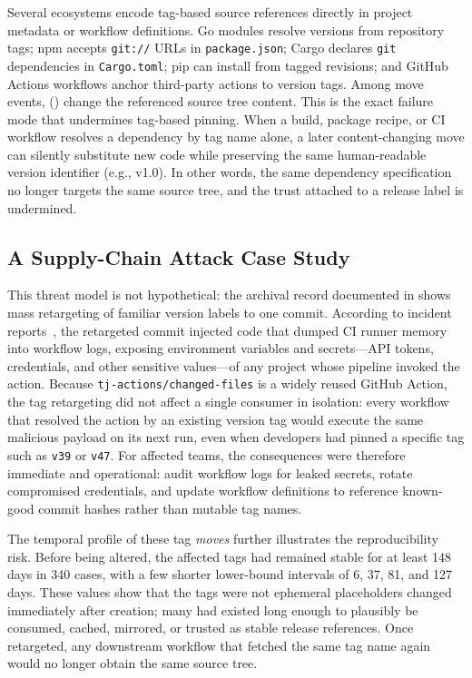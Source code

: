 Several ecosystems encode tag-based source references directly in project metadata or workflow definitions.
Go modules resolve versions from repository tags; npm accepts \texttt{git://} URLs in \texttt{package.json}; Cargo declares \texttt{git} dependencies in \texttt{Cargo.toml}; pip can install from tagged revisions; and GitHub Actions workflows anchor third-party actions to version tags.
Among \LegitMoves move events, \DirectoryDiff (\PercentMovesContentChange) change the referenced source tree content.
This is the exact failure mode that undermines tag-based pinning.
When a build, package recipe, or CI workflow resolves a dependency by tag name alone, a later content-changing move can silently substitute new code while preserving the same human-readable version identifier (e.g., v1.0).
In other words, the same dependency specification no longer targets the same source tree, and the trust attached to a release label is undermined.

\subsection{A Supply-Chain Attack Case Study}
\label{subsec:tags-attack-case}

This threat model is not hypothetical: the archival record documented in  shows mass retargeting of familiar version labels to one commit.
According to incident reports~\cite{paloalto_unit42_2025}, the retargeted commit injected code that dumped CI runner memory into workflow logs, exposing environment variables and secrets---API tokens, credentials, and other sensitive values---of any project whose pipeline invoked the action.
Because \texttt{\footnotesize{tj-actions/changed-files}} is a widely reused GitHub Action, the tag retargeting did not affect a single consumer in isolation: every workflow that resolved the action by an existing version tag would execute the same malicious payload on its next run, even when developers had pinned a specific tag such as \texttt{v39} or \texttt{v47}.
For affected teams, the consequences were therefore immediate and operational: audit workflow logs for leaked secrets, rotate compromised credentials, and update workflow definitions to reference known-good commit hashes rather than mutable tag names.

The temporal profile of these tag \emph{moves} further illustrates the reproducibility risk.
Before being altered, the affected tags had remained stable for at least \num{148} days in \num{340} cases, with a few shorter lower-bound intervals of \num{6}, \num{37}, \num{81}, and \num{127} days.
These values show that the tags were not ephemeral placeholders changed immediately after creation; many had existed long enough to plausibly be consumed, cached, mirrored, or trusted as stable release references.
Once retargeted, any downstream workflow that fetched the same tag name again would no longer obtain the same source tree.

